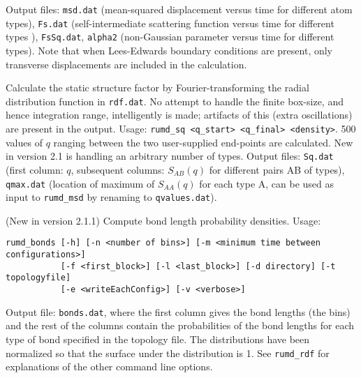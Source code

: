 \documentclass[a4paper]{article}
\begin{document}
\begin{description}
Output files: \verb|msd.dat| (mean-squared displacement versus time for 
different atom types), \verb|Fs.dat| (self-intermediate scattering function 
versus time for different types ), \verb|FsSq.dat|, \verb|alpha2| (non-Gaussian
 parameter versus time for different types). Note that when Lees-Edwards 
boundary conditions are present, only transverse displacements are 
included in the calculation.
\item[\Q{rumd_sq}] Calculate the static structure factor by Fourier-transforming
  the radial distribution function in \verb|rdf.dat|. No attempt to  handle the finite 
box-size, and hence integration range, intelligently is made; artifacts of this
(extra oscillations) are present in the output. Usage: 
\verb|rumd_sq <q_start> <q_final> <density>|. 500 values of $q$ ranging between 
the two user-supplied end-points are calculated. New in version 2.1 is handling
an arbitrary number of types.
Output files: \verb|Sq.dat| (first column: $q$, subsequent columns: $S_{AB}(q)$ 
for different pairs AB of types), \verb|qmax.dat| (location of maximum 
of $S_{AA}(q)$ for each type A, can be used as input to \verb|rumd_msd| by renaming to 
\verb|qvalues.dat|).

\item[\Q{rumd_bonds}] (New in version 2.1.1) Compute bond length probability 
densities. Usage: 
\begin{verbatim}
rumd_bonds [-h] [-n <number of bins>] [-m <minimum time between configurations>]
           [-f <first_block>] [-l <last_block>] [-d directory] [-t topologyfile]
           [-e <writeEachConfig>] [-v <verbose>] 
\end{verbatim} 
Output file: \verb|bonds.dat|, where the first column gives the bond lengths (the bins) and the rest of the columns contain the probabilities of the bond lengths for each type of bond specified in the topology file. The distributions have been normalized so that the surface under the distribution is 1. See \verb|rumd_rdf| for explanations of the other command line options.


\end{description}
\end{document}
